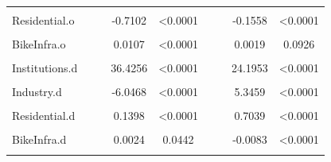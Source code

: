 \documentclass[smallextended]{svjour3}       %
\begin{document}
\begin{landscape}
\begin{table}
{\begin{tabular}[t]{lcccccccc}
\cellcolor{gray!6}{Office.o} & \cellcolor{gray!6}{} & \cellcolor{gray!6}{} & \cellcolor{gray!6}{-11.2755} & \cellcolor{gray!6}{<0.0001} & \cellcolor{gray!6}{} & \cellcolor{gray!6}{} & \cellcolor{gray!6}{-10.2228} & \cellcolor{gray!6}{<0.0001}\\
Residential.o &  &  & -0.7102 & <0.0001 &  &  & -0.1558 & <0.0001\\
\cellcolor{gray!6}{BusStops.o} & \cellcolor{gray!6}{} & \cellcolor{gray!6}{} & \cellcolor{gray!6}{1.6269} & \cellcolor{gray!6}{<0.0001} & \cellcolor{gray!6}{} & \cellcolor{gray!6}{} & \cellcolor{gray!6}{1.7688} & \cellcolor{gray!6}{<0.0001}\\
BikeInfra.o &  &  & 0.0107 & <0.0001 &  &  & 0.0019 & 0.0926\\
\cellcolor{gray!6}{Population.d} & \cellcolor{gray!6}{} & \cellcolor{gray!6}{} & \cellcolor{gray!6}{-166.7009} & \cellcolor{gray!6}{<0.0001} & \cellcolor{gray!6}{} & \cellcolor{gray!6}{} & \cellcolor{gray!6}{-97.1404} & \cellcolor{gray!6}{<0.0001}\\
Institutions.d &  &  & 36.4256 & <0.0001 &  &  & 24.1953 & <0.0001\\
\cellcolor{gray!6}{Commercial.d} & \cellcolor{gray!6}{} & \cellcolor{gray!6}{} & \cellcolor{gray!6}{1.5804} & \cellcolor{gray!6}{7e-04} & \cellcolor{gray!6}{} & \cellcolor{gray!6}{} & \cellcolor{gray!6}{-8.0098} & \cellcolor{gray!6}{<0.0001}\\
Industry.d &  &  & -6.0468 & <0.0001 &  &  & 5.3459 & <0.0001\\
\cellcolor{gray!6}{Office.d} & \cellcolor{gray!6}{} & \cellcolor{gray!6}{} & \cellcolor{gray!6}{6.8574} & \cellcolor{gray!6}{<0.0001} & \cellcolor{gray!6}{} & \cellcolor{gray!6}{} & \cellcolor{gray!6}{15.0947} & \cellcolor{gray!6}{<0.0001}\\
Residential.d &  &  & 0.1398 & <0.0001 &  &  & 0.7039 & <0.0001\\
\cellcolor{gray!6}{BusStops.d} & \cellcolor{gray!6}{} & \cellcolor{gray!6}{} & \cellcolor{gray!6}{-1.503} & \cellcolor{gray!6}{<0.0001} & \cellcolor{gray!6}{} & \cellcolor{gray!6}{} & \cellcolor{gray!6}{-1.2592} & \cellcolor{gray!6}{<0.0001}\\
BikeInfra.d &  &  & 0.0024 & 0.0442 &  &  & -0.0083 & <0.0001\\
\cellcolor{gray!6}{Full\_time\_jobs.d} & \cellcolor{gray!6}{} & \cellcolor{gray!6}{} & \cellcolor{gray!6}{0.1907} & \cellcolor{gray!6}{<0.0001} & \cellcolor{gray!6}{} & \cellcolor{gray!6}{} & \cellcolor{gray!6}{0.0796} & \cellcolor{gray!6}{<0.0001}\\

\end{tabular}}
\end{table}
\end{landscape}
\end{document}
